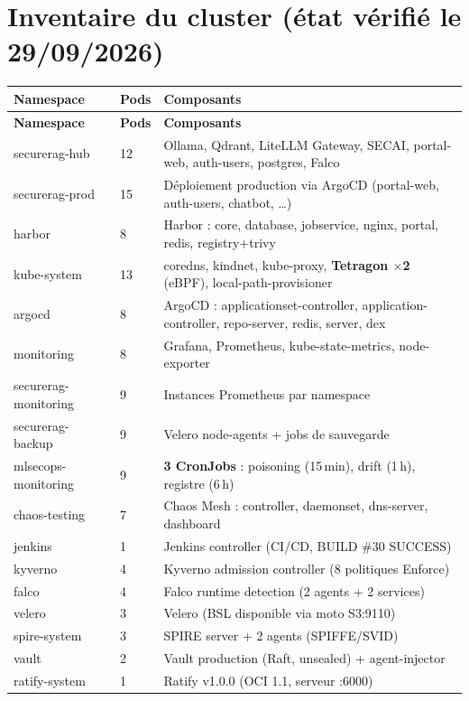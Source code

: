 \documentclass[12pt,a4paper,openany]{report}
\begin{document}
\section{Inventaire du cluster (état vérifié le 29/09/2026)}

\begin{longtable}{@{}lll@{}}
\toprule
\textbf{Namespace} & \textbf{Pods} & \textbf{Composants} \\
\midrule
\endfirsthead
\toprule
\textbf{Namespace} & \textbf{Pods} & \textbf{Composants} \\
\midrule
\endhead
securerag-hub & 12 & Ollama, Qdrant, LiteLLM Gateway, SECAI, portal-web, auth-users, postgres, Falco \\
securerag-prod & 15 & Déploiement production via ArgoCD (portal-web, auth-users, chatbot, \dots) \\
harbor & 8 & Harbor : core, database, jobservice, nginx, portal, redis, registry+trivy \\
kube-system & 13 & coredns, kindnet, kube-proxy, \textbf{Tetragon $\times$2} (eBPF), local-path-provisioner \\
argocd & 8 & ArgoCD : applicationset-controller, application-controller, repo-server, redis, server, dex \\
monitoring & 8 & Grafana, Prometheus, kube-state-metrics, node-exporter \\
securerag-monitoring & 9 & Instances Prometheus par namespace \\
securerag-backup & 9 & Velero node-agents + jobs de sauvegarde \\
mlsecops-monitoring & 9 & \textbf{3 CronJobs} : poisoning (15\,min), drift (1\,h), registre (6\,h) \\
chaos-testing & 7 & Chaos Mesh : controller, daemonset, dns-server, dashboard \\
jenkins & 1 & Jenkins controller (CI/CD, BUILD \#30 SUCCESS) \\
kyverno & 4 & Kyverno admission controller (8 politiques Enforce) \\
falco & 4 & Falco runtime detection (2 agents + 2 services) \\
velero & 3 & Velero (BSL disponible via moto S3:9110) \\
spire-system & 3 & SPIRE server + 2 agents (SPIFFE/SVID) \\
vault & 2 & Vault production (Raft, unsealed) + agent-injector \\
ratify-system & 1 & Ratify v1.0.0 (OCI 1.1, serveur :6000) \\

\end{longtable}
\end{document}
